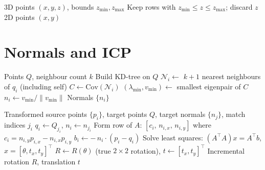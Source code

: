 \documentclass[11pt,a4paper]{article}
\begin{document}
\begin{algorithm}
\caption{Height filter and projection to 2D (\texttt{filter\_and\_flatten})}
\begin{algorithmic}[1]
\Require 3D points $(x,y,z)$, bounds $z_{\min}, z_{\max}$
\State Keep rows with $z_{\min} \le z \le z_{\max}$; discard $z$
\Ensure 2D points $(x,y)$
\end{algorithmic}
\end{algorithm}

\section{Normals and ICP}

\begin{algorithm}
\caption{2D normal estimation via local PCA (\texttt{estimate\_normals\_2d})}
\begin{algorithmic}[1]
\Require Points $Q$, neighbour count $k$
\State Build KD-tree on $Q$
    \State $\mathcal{N}_i \gets$ $k{+}1$ nearest neighbours of $q_i$ (including self)
    \State $C \gets \mathrm{Cov}(\mathcal{N}_i)$ 
    \State $(\lambda_{\min}, v_{\min}) \gets$ smallest eigenpair of $C$
    \State $n_i \gets v_{\min} / \|v_{\min}\|$ 
\EndFor
\Ensure Normals $\{n_i\}$
\end{algorithmic}
\end{algorithm}

\begin{algorithm}
\caption{One point-to-line ICP step, 2D linearised (\texttt{\_point\_to\_line\_solve\_2d})}
\begin{algorithmic}[1]
\Require Transformed source points $\{p_i\}$, target points $Q$, target normals $\{n_j\}$, match indices $j_i$
    \State $q_i \gets Q_{j_i}$, \quad $n_i \gets n_{j_i}$
    \State Form row of $A$: $[c_i,\, n_{i,x},\, n_{i,y}]$ where $c_i = n_{i,y} p_{i,x} - n_{i,x} p_{i,y}$
    \State $b_i \gets -\, n_i \cdot (p_i - q_i)$
\EndFor
\State Solve least squares: $(A^\top A) x = A^\top b$, \quad $x = [\theta, t_x, t_y]^\top$
\State $R \gets R(\theta)$ (true $2\times 2$ rotation), $t \gets [t_x, t_y]^\top$
\Ensure Incremental rotation $R$, translation $t$
\end{algorithmic}
\end{algorithm}
\end{document}
